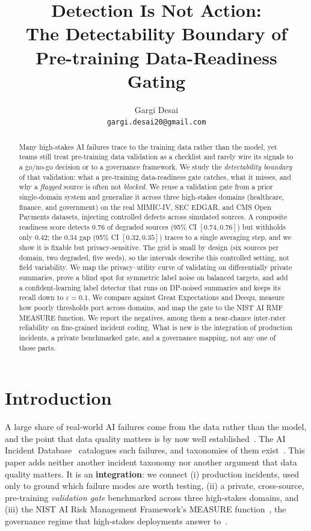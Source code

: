 \documentclass[11pt]{article}
\title{\textbf{Detection Is Not Action:}\\
The Detectability Boundary of Pre-training Data-Readiness Gating}
\author{Gargi Desai\\\texttt{gargi.desai20@gmail.com}}
\date{}
\begin{document}
\maketitle

\begin{abstract}
Many high-stakes AI failures trace to the training data rather than the model, yet
teams still treat pre-training data validation as a checklist and rarely wire its
signals to a go/no-go decision or to a governance framework. We study the
\emph{detectability boundary} of that validation: what a pre-training
data-readiness gate catches, what it misses, and why a \emph{flagged} source is
often not \emph{blocked}. We reuse a validation gate from a prior single-domain
system and generalize it across three high-stakes domains (healthcare, finance,
and government) on the real MIMIC-IV, SEC EDGAR, and CMS Open Payments datasets,
injecting controlled defects across simulated sources. A composite readiness score
detects $0.76$ of degraded sources (95\% CI $[0.74,0.76]$) but withholds only
$0.42$; the $0.34$ gap (95\% CI $[0.32,0.35]$) traces to a single averaging step,
and we show it is fixable but privacy-sensitive. The grid is small by design (six
sources per domain, two degraded, five seeds), so the intervals describe this
controlled setting, not field variability. We map the privacy--utility curve of
validating on differentially private summaries, prove a blind spot for symmetric
label noise on balanced targets, and add a confident-learning label detector that
runs on DP-noised summaries and keeps its recall down to $\varepsilon{=}0.1$. We
compare against Great Expectations and Deequ, measure how poorly thresholds port
across domains, and map the gate to the NIST AI RMF MEASURE function. We report the
negatives, among them a near-chance inter-rater reliability on fine-grained
incident coding. What is new is the integration of production incidents, a private
benchmarked gate, and a governance mapping, not any one of those parts.
\end{abstract}

\section{Introduction}

A large share of real-world AI failures come from the data rather than the model,
and the point that data quality matters is by now well
established~\citep{sambasivan2021datacascades,sculley2015debt}. The AI Incident
Database~\citep{mcgregor2021aiid} catalogues such failures, and taxonomies of them
exist~\citep{paeth2024aiid}. This paper adds neither another incident taxonomy nor
another argument that data quality matters. It is an \textbf{integration}: we
connect (i) production incidents, used only to ground which failure modes are worth
testing, (ii) a private, cross-source, pre-training \emph{validation gate}
benchmarked across three high-stakes domains, and (iii) the NIST AI Risk Management
Framework's MEASURE function~\citep{nistairmf2023}, the governance regime that
high-stakes deployments answer to~\citep{euaiact2024,isoiec42001}.
\end{document}
